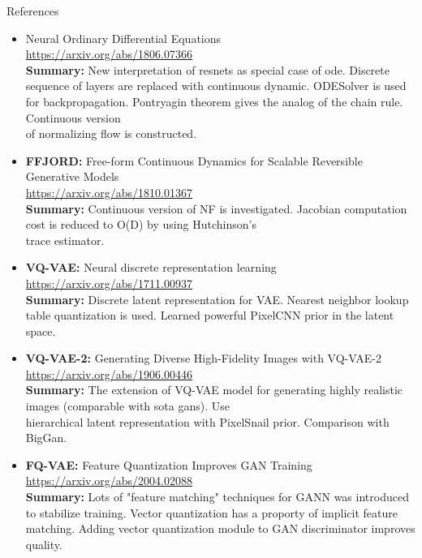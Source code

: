 \documentclass{beamer}
\begin{document}
\begin{frame}{References}
{\tiny
\begin{itemize}
    \item Neural Ordinary Differential Equations \\
    \href{https://arxiv.org/abs/1806.07366}{https://arxiv.org/abs/1806.07366} \\
    \textbf{Summary:} New interpretation of resnets as special case of ode. 
    Discrete sequence of layers  are replaced with continuous dynamic. ODESolver is used for backpropagation. Pontryagin theorem gives the analog of the chain rule. Continuous version \\ of normalizing flow is constructed.
    
    \item \textbf{FFJORD:} Free-form Continuous Dynamics for Scalable Reversible Generative Models \\
    \href{https://arxiv.org/abs/1810.01367}{https://arxiv.org/abs/1810.01367} \\
    \textbf{Summary:} Continuous version of NF is investigated. 
    Jacobian computation cost is reduced to O(D) by using Hutchinson’s \\ trace estimator. 
    
    \item \textbf{VQ-VAE:} Neural discrete representation learning \\
    \href{https://arxiv.org/abs/1711.00937}{https://arxiv.org/abs/1711.00937} \\
    \textbf{Summary:} Discrete latent representation for VAE. Nearest neighbor lookup table quantization is used. Learned powerful PixelCNN prior in the latent space.
    
    \item \textbf{VQ-VAE-2:} Generating Diverse High-Fidelity Images with VQ-VAE-2 \\
    \href{https://arxiv.org/abs/1906.00446}{https://arxiv.org/abs/1906.00446} \\
    \textbf{Summary:} The extension of VQ-VAE model for generating highly realistic images (comparable with sota gans). Use \\ hierarchical latent representation with PixelSnail prior. Comparison with BigGan.
    
    \item \textbf{FQ-VAE:} Feature Quantization Improves GAN Training \\
    \href{https://arxiv.org/abs/2004.02088}{https://arxiv.org/abs/2004.02088} \\
    \textbf{Summary:} Lots of "feature matching" techniques for GANN was introduced to stabilize training. Vector quantization has a proporty of implicit feature matching. Adding vector quantization module to GAN discriminator improves quality.
\end{itemize}
}
\end{frame}
\end{document}
